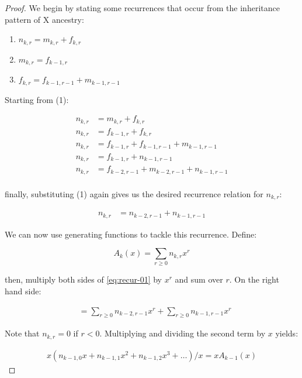 \documentclass[9pt,twocolumn,twoside]{gsajnl}
\begin{document}
\begin{proof}

 We begin by stating some recurrences that occur from the inheritance pattern of
 X ancestry:

\begin{enumerate}
  \item $ n_{k,r} = m_{k,r} + f_{k,r} $
  \item $ m_{k,r} = f_{k-1,r} $
  \item $ f_{k,r} = f_{k-1, r-1} + m_{k-1,r-1} $
\end{enumerate}

Starting from (1):

\begin{align} 
   n_{k,r} &= m_{k,r} + f_{k,r} \\
   n_{k,r} &= f_{k-1,r} + f_{k,r} \\
   n_{k,r} &= f_{k-1,r} + f_{k-1, r-1} + m_{k-1,r-1} \\
   n_{k,r} &= f_{k-1,r} + n_{k-1, r-1} \\
   n_{k,r} &= f_{k-2, r-1} + m_{k-2,r-1} + n_{k-1, r-1} \\
\end{align}

finally, substituting (1) again gives us the desired recurrence relation
for $n_{k,r}$:

\begin{align} \label{eq:recur-01}
   n_{k,r} &= n_{k-2, r-1} + n_{k-1, r-1}
\end{align}

We can now use generating functions \citep{wilf2013generatingfunctionology} to
tackle this recurrence. Define:

\begin{equation}
  A_k(x) = \sum_{r \ge 0} n_{k,r} x^r
\end{equation}

then, multiply both sides of \eqref{eq:recur-01} by $x^r$ and sum over $r$. On
the right hand side:

\begin{align}
  &= \sum_{r \ge 0} n_{k-2, r-1} x^r + \sum_{r \ge 0} n_{k-1, r-1} x^r
\end{align}

 Note that $n_{k,r} = 0$ if $r < 0$. Multiplying and dividing the second term by
 $x$ yields:

 \begin{align}
   x(n_{k-1, 0} x + n_{k-1, 1} x^2 + n_{k-1, 2} x^3 + \ldots)/x = x A_{k-1}(x) 
 \end{align}


\end{proof}
\end{document}
